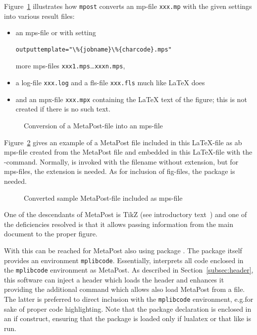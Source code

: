 Figure~\ref{fig:mp2mps} illustrates 
how \texttt{mpost} converts an \gls{mp}-file \texttt{xxx.mp} 
with the given settings into various result files: 
%
\begin{itemize}
\item
an \gls{mps}-file or with setting 
\begin{verbatim}outputtemplate="\%{jobname}\%{charcode}.mps"\end{verbatim}
more \gls{mps}-files \texttt{xxx1.mps}\dots \texttt{xxxn.mps}, 
\item
a log-file \texttt{xxx.log} and a fls-file \texttt{xxx.fls} much like \LaTeX{} does 
\item
and an \gls{mpx}-file \texttt{xxx.mpx} containing the \LaTeX{} text of the figure; 
this is not created if there is no such text. 
\end{itemize}



\begin{figure}[htb]
\centering
{}
\caption{\label{fig:mp2mps}Conversion of a MetaPost-file into an mps-file}
\end{figure}


Figure~\ref{fig:metapost} gives an example of a MetaPost file 
included in this \LaTeX-file as ab mps-file 
created from the MetaPost file 
and embedded in this \LaTeX-file 
with the -command. 
Normally,  is invoked with the filename without extension, 
but for mps-files, the extension is needed. 
As for inclusion of fig-files, the package  is needed. 

\begin{figure}[htb]
\centering
{}
\caption{\label{fig:metapost}
Converted sample MetaPost-file included as mps-file  }
\end{figure}

One of the descendants of MetaPost is TikZ (see introductory text~\cite{TikzIntro})
and one of the deficiencies resolved is that it allows passing information 
from the main document to the proper figure. 

With \lualatex{} this can be reached for MetaPost also using package . 
The package itself provides an environment \texttt{mplibcode}. 
Essentially, \lualatex{} interprets all code 
enclosed in the \texttt{mplibcode} environment as MetaPost. 
As described in Section~\ref{subsec:header}, 
this software can inject a header which loads the header 
and enhances it providing the additional command  
which allows also load MetaPost from a file. 
The latter is preferred to direct inclusion with the \texttt{mplibcode} environment, 
e.g.\@ for sake of proper code highlighting. 
Note that the package declaration is enclosed in an if construct, 
ensuring that the package is loaded only if lualatex or that like is run. 

